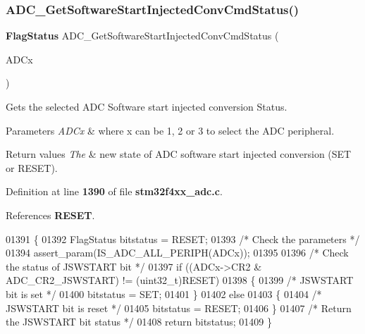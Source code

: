 \subsubsection{A\+D\+C\+\_\+\+Get\+Software\+Start\+Injected\+Conv\+Cmd\+Status()}
{\footnotesize\ttfamily \textbf{ Flag\+Status} A\+D\+C\+\_\+\+Get\+Software\+Start\+Injected\+Conv\+Cmd\+Status (\begin{DoxyParamCaption}\item[{\textbf{ A\+D\+C\+\_\+\+Type\+Def} $\ast$}]{A\+D\+Cx }\end{DoxyParamCaption})}



Gets the selected A\+DC Software start injected conversion Status. 


\begin{DoxyParams}{Parameters}
{\em A\+D\+Cx} & where x can be 1, 2 or 3 to select the A\+DC peripheral. \\
\hline
\end{DoxyParams}

\begin{DoxyRetVals}{Return values}
{\em The} & new state of A\+DC software start injected conversion (S\+ET or R\+E\+S\+ET). \\
\hline
\end{DoxyRetVals}


Definition at line \textbf{ 1390} of file \textbf{ stm32f4xx\+\_\+adc.\+c}.



References \textbf{ R\+E\+S\+ET}.


\begin{DoxyCode}
01391 \{
01392   FlagStatus bitstatus = RESET;
01393   \textcolor{comment}{/* Check the parameters */}
01394   assert_param(IS_ADC_ALL_PERIPH(ADCx));
01395   
01396   \textcolor{comment}{/* Check the status of JSWSTART bit */}
01397   \textcolor{keywordflow}{if} ((ADCx->CR2 & ADC_CR2_JSWSTART) != (uint32\_t)RESET)
01398   \{
01399     \textcolor{comment}{/* JSWSTART bit is set */}
01400     bitstatus = SET;
01401   \}
01402   \textcolor{keywordflow}{else}
01403   \{
01404     \textcolor{comment}{/* JSWSTART bit is reset */}
01405     bitstatus = RESET;
01406   \}
01407   \textcolor{comment}{/* Return the JSWSTART bit status */}
01408   \textcolor{keywordflow}{return}  bitstatus;
01409 \}
\end{DoxyCode}
\mbox{\label{group__ADC__Group6_gae2b44bff080184e1cf6f2cb6b9bb3e59}} 
